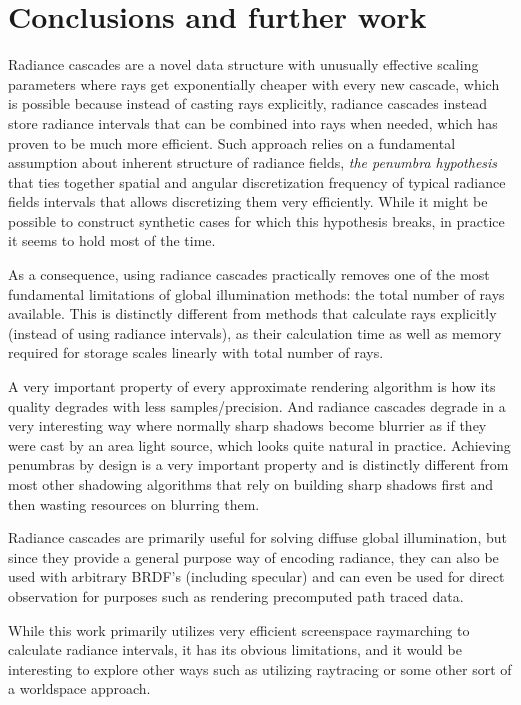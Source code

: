 \documentclass{jcgt}
\begin{document}
\section{Conclusions and further work}
Radiance cascades are a novel data structure with unusually effective scaling parameters where rays get exponentially cheaper with every new cascade, which is possible because instead of casting rays explicitly, radiance cascades instead store radiance intervals that can be combined into rays when needed, which has proven to be much more efficient. Such approach relies on a fundamental assumption about inherent structure of radiance fields, \emph{the penumbra hypothesis} that ties together spatial and angular discretization frequency of typical radiance fields intervals that allows discretizing them very efficiently. While it might be possible to construct synthetic cases for which this hypothesis breaks, in practice it seems to hold most of the time.

As a consequence, using radiance cascades practically removes one of the most fundamental limitations of global illumination methods: the total number of rays available. This is distinctly different from methods that calculate rays explicitly (instead of using radiance intervals), as their calculation time as well as memory required for storage scales linearly with total number of rays.

A very important property of every approximate rendering algorithm is how its quality degrades with less samples/precision. And radiance cascades degrade in a very interesting way where normally sharp shadows become blurrier as if they were cast by an area light source, which looks quite natural in practice. Achieving penumbras by design is a very important property and is distinctly different from most other shadowing algorithms that rely on building sharp shadows first and then wasting resources on blurring them. 

Radiance cascades are primarily useful for solving diffuse global illumination, but since they provide a general purpose way of encoding radiance, they can also be used with arbitrary BRDF's (including specular) and can even be used for direct observation for purposes such as rendering precomputed path traced data.

While this work primarily utilizes very efficient screenspace raymarching to calculate radiance intervals, it has its obvious limitations, and it would be interesting to explore other ways such as utilizing raytracing or some other sort of a worldspace approach.
\end{document}
